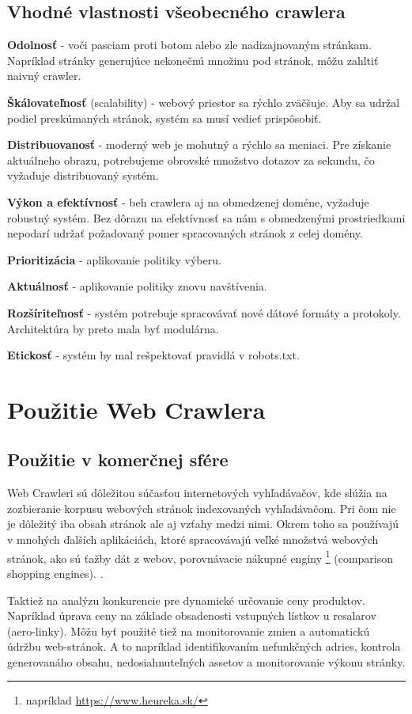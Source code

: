 \subsection{Vhodné vlastnosti všeobecného crawlera}

\textbf{Odolnosť} - voči pasciam proti botom alebo zle nadizajnovaným stránkam. Napríklad stránky generujúce nekonečnú množinu pod stránok, môžu zahltiť naivný crawler. 

\textbf{Škálovateľnosť} (scalability) - webový priestor sa rýchlo zväčšuje. Aby sa udržal podiel preskúmaných stránok, systém sa musí 
vedieť prispôsobiť. 

\textbf{Distribuovanosť} -  moderný web je mohutný a rýchlo sa meniaci. Pre získanie aktuálneho obrazu, potrebujeme obrovské množstvo dotazov za sekundu, čo vyžaduje distribuovaný systém. 

\textbf{Výkon a efektívnosť} - beh crawlera aj na obmedzenej doméne, vyžaduje robustný systém. Bez dôrazu na efektívnosť sa nám s obmedzenými prostriedkami nepodarí udržať požadovaný pomer spracovaných stránok z celej domény.

\textbf{Prioritizácia} - aplikovanie politiky výberu.

\textbf{Aktuálnosť} - aplikovanie politiky znovu navštívenia.

\textbf{Rozšíriteľnosť} - systém potrebuje spracovávať nové dátové formáty a protokoly. Architektúra by preto mala byť modulárna. 

\textbf{Etickosť} - systém by mal rešpektovať pravidlá v robots.txt.

\section{Použitie Web Crawlera}

\subsection{Použitie v komerčnej sfére}
Web Crawleri sú dôležitou súčasťou internetových vyhľadávačov, kde slúžia na zozbieranie korpusu webových stránok indexovaných vyhľadávačom. Pri čom nie je dôležitý iba obsah stránok ale aj vzťahy medzi nimi. Okrem toho sa používajú v mnohých ďalších aplikáciách, ktoré spracovávajú veľké množstvá webových stránok, ako sú ťažby dát z webov, porovnávacie nákupné enginy \footnote{ napríklad \url{https://www.heureka.sk/}} (comparison shopping engines). \cite{encykOfDatabases}.  

Taktiež na analýzu konkurencie pre dynamické určovanie ceny produktov. Napríklad úprava ceny na základe obsadenosti vstupných lístkov u resalarov (aero-linky). 
Môžu byť použité tiež na monitorovanie zmien a automatickú údržbu web-stránok. A to napríklad identifikovaním nefunkčných adries, kontrola generovanáho obsahu, nedosiahnuteľných assetov a monitorovanie výkonu stránky. \cite{crawlPageTesting}


